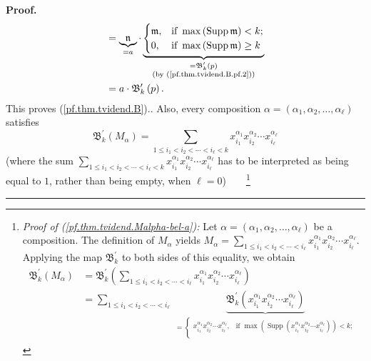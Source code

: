 \documentclass
[numbers=enddot,12pt,final,onecolumn,notitlepage,abstracton]{scrartcl}%
\theoremstyle{definition}
\newenvironment{proof}[1][Proof]{\noindent\textbf{#1.} }{\ \rule{0.5em}{0.5em}}
\newenvironment{verlong}{}{}
\let\sumnonlimits\sum
\renewcommand{\sum}{\sumnonlimits\limits}
\begin{document}
\begin{verlong}
\begin{proof}
{\begin{align*}
&  =\underbrace{\mathfrak{n}}_{=a}\cdot\underbrace{
\begin{cases}
\mathfrak{m}, & \text{if }\max\left(  \operatorname*{Supp}\mathfrak{m}\right)
<k;\\
0, & \text{if }\max\left(  \operatorname*{Supp}\mathfrak{m}\right)  \geq k
\end{cases}
}_{\substack{=\mathfrak{B}_{k}^{\prime}\left(  p\right)  \\\text{(by
(\ref{pf.thm.tvidend.B.pf.2}))}}}\\
&  =a\cdot\mathfrak{B}_{k}^{\prime}\left(  p\right)  .
\end{align*}
This proves (\ref{pf.thm.tvidend.B}).}. Also, every composition $\alpha
=\left(  \alpha_{1},\alpha_{2},\ldots,\alpha_{\ell}\right)  $ satisfies%
\begin{equation}
\mathfrak{B}_{k}^{\prime}\left(  M_{\alpha}\right)  =\sum_{1\leq i_{1}%
<i_{2}<\cdots<i_{\ell}<k}x_{i_{1}}^{\alpha_{1}}x_{i_{2}}^{\alpha_{2}}\cdots
x_{i_{\ell}}^{\alpha_{\ell}} \label{pf.thm.tvidend.Malpha-bel-a}%
\end{equation}
(where the sum $\sum_{1\leq i_{1}<i_{2}<\cdots<i_{\ell}<k}x_{i_{1}}%
^{\alpha_{1}}x_{i_{2}}^{\alpha_{2}}\cdots x_{i_{\ell}}^{\alpha_{\ell}}$ has to
be interpreted as being equal to $1$, rather than being empty, when $\ell
=0$)\ \ \ \ \footnote{\textit{Proof of (\ref{pf.thm.tvidend.Malpha-bel-a}):}
Let $\alpha=\left(  \alpha_{1},\alpha_{2},\ldots,\alpha_{\ell}\right)  $ be a
composition. The definition of $M_{\alpha}$ yields $M_{\alpha}=\sum_{1\leq
i_{1}<i_{2}<\cdots<i_{\ell}}x_{i_{1}}^{\alpha_{1}}x_{i_{2}}^{\alpha_{2}}\cdots
x_{i_{\ell}}^{\alpha_{\ell}}$. Applying the map $\mathfrak{B}_{k}^{\prime}$ to
both sides of this equality, we obtain%
\begin{align*}
\mathfrak{B}_{k}^{\prime}\left(  M_{\alpha}\right)   &  =\mathfrak{B}%
_{k}^{\prime}\left(  \sum_{1\leq i_{1}<i_{2}<\cdots<i_{\ell}}x_{i_{1}}%
^{\alpha_{1}}x_{i_{2}}^{\alpha_{2}}\cdots x_{i_{\ell}}^{\alpha_{\ell}}\right)
\\
&  =\sum_{1\leq i_{1}<i_{2}<\cdots<i_{\ell}}\underbrace{\mathfrak{B}%
_{k}^{\prime}\left(  x_{i_{1}}^{\alpha_{1}}x_{i_{2}}^{\alpha_{2}}\cdots
x_{i_{\ell}}^{\alpha_{\ell}}\right)  }_{\substack{=
\begin{cases}
x_{i_{1}}^{\alpha_{1}}x_{i_{2}}^{\alpha_{2}}\cdots x_{i_{\ell}}^{\alpha_{\ell
}}, & \text{if }\max\left(  \operatorname*{Supp}\left(  x_{i_{1}}^{\alpha_{1}%
}x_{i_{2}}^{\alpha_{2}}\cdots x_{i_{\ell}}^{\alpha_{\ell}}\right)  \right)
<k;\\

\end{cases}}}
\end{align*}}
\end{proof}
\end{verlong}
\end{document}
